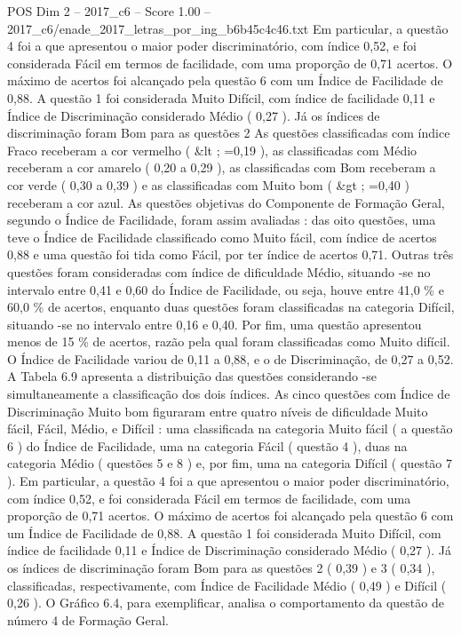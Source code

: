 \begin{textsample}{POS Dim 2 – 2017\_c6 – Score 1.00 – 2017\_c6/enade\_2017\_letras\_por\_ing\_b6b45c4c46.txt}
Em particular, a questão 4 foi a que apresentou o maior poder discriminatório, com índice 0,52, e foi considerada Fácil em termos de facilidade, com uma proporção de 0,71 acertos.
O máximo de acertos foi alcançado pela questão 6 com um Índice de Facilidade de 0,88.
A questão 1 foi considerada Muito Difícil, com índice de facilidade 0,11 e Índice de Discriminação considerado Médio ( 0,27 ).
Já os índices de discriminação foram Bom para as questões 2 As questões classificadas com índice Fraco receberam a cor vermelho ( \&lt ; =0,19 ), as classificadas com Médio receberam a cor amarelo ( 0,20 a 0,29 ), as classificadas com Bom receberam a cor verde ( 0,30 a 0,39 ) e as classificadas com Muito bom ( \&gt ; =0,40 ) receberam a cor azul.
As questões objetivas do Componente de Formação Geral, segundo o Índice de Facilidade, foram assim avaliadas : das oito questões, uma teve o Índice de Facilidade classificado como Muito fácil, com índice de acertos 0,88 e uma questão foi tida como Fácil, por ter índice de acertos 0,71.
Outras três questões foram consideradas com índice de dificuldade Médio, situando -se no intervalo entre 0,41 e 0,60 do Índice de Facilidade, ou seja, houve entre 41,0 \% e 60,0 \% de acertos, enquanto duas questões foram classificadas na categoria Difícil, situando -se no intervalo entre 0,16 e 0,40.
Por fim, uma questão apresentou menos de 15 \% de acertos, razão pela qual foram classificadas como Muito difícil.
O Índice de Facilidade variou de 0,11 a 0,88, e o de Discriminação, de 0,27 a 0,52.
A Tabela 6.9 apresenta a distribuição das questões considerando -se simultaneamente a classificação dos dois índices.
As cinco questões com Índice de Discriminação Muito bom figuraram entre quatro níveis de dificuldade Muito fácil, Fácil, Médio, e Difícil : uma classificada na categoria Muito fácil ( a questão 6 ) do Índice de Facilidade, uma na categoria Fácil ( questão 4 ), duas na categoria Médio ( questões 5 e 8 ) e, por fim, uma na categoria Difícil ( questão 7 ).
Em particular, a questão 4 foi a que apresentou o maior poder discriminatório, com índice 0,52, e foi considerada Fácil em termos de facilidade, com uma proporção de 0,71 acertos.
O máximo de acertos foi alcançado pela questão 6 com um Índice de Facilidade de 0,88.
A questão 1 foi considerada Muito Difícil, com índice de facilidade 0,11 e Índice de Discriminação considerado Médio ( 0,27 ).
Já os índices de discriminação foram Bom para as questões 2 ( 0,39 ) e 3 ( 0,34 ), classificadas, respectivamente, com Índice de Facilidade Médio ( 0,49 ) e Difícil ( 0,26 ).
O Gráfico 6.4, para exemplificar, analisa o comportamento da questão de número 4 de Formação Geral.

\end{textsample}
